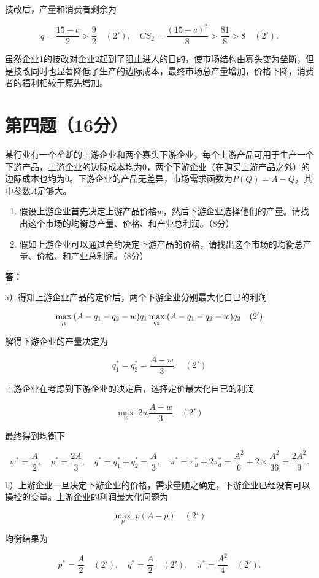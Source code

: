\documentclass[12pt]{article}
\begin{document}
技改后，产量和消费者剩余为

$$q=\frac{15-c}{2}>\frac{9}{2}\quad(2'),\quad CS_2=\frac{(15-c)^2}{8}>\frac{81}{8}>8\quad(2').$$

虽然企业1的技改对企业2起到了阻止进人的目的，使市场结构由寡头变为垒断，但是技改同时也显著降低了生产的边际成本，最终市场总产量增加，价格下降，消费者的福利相较于原先增加。

\section*{第四题（16分）}
某行业有一个垄断的上游企业和两个寡头下游企业，每个上游产品可用于生产一个下游产品，上游企业的边际成本均为0，两个下游企业（在购买上游产品之外）的边际成本也均为0。下游企业的产品无差异，市场需求函数为$P(Q)=A-Q$，其中参数$A$足够大。

\begin{enumerate}
\item 假设上游企业首先决定上游产品价格$w$，然后下游企业选择他们的产量。请找出这个市场的均衡总产量、价格、和产业总利润。（8分）
\item 假如上游企业可以通过合约决定下游产品的价格，请找出这个市场的均衡总产量、价格、和产业总利润。（8分）
\end{enumerate}

\noindent\textbf{答：}

a）得知上游企业产品的定价后，两个下游企业分别最大化自已的利润

$$\max_{q_{1}}\:(A-q_{1}-q_{2}-w)q_{1}\\\max_{q_{2}}\:(A-q_{1}-q_{2}-w)q_{2}\quad(2')$$

解得下游企业的产量决定为

$$q_1^*=q_2^*=\frac{A-w}{3}.\quad(2')$$

上游企业在考虑到下游企业的决定后，选择定价最大化自已的利润

$$\max_w\:2w\frac{A-w}{3}\quad(2')$$

最终得到均衡下

$$w^*=\frac{A}{2},\quad p^*=\frac{2A}{3},\quad q^*=q_1^*+q_2^*=\frac{A}{3},\quad\pi^*=\pi_u^*+2\pi_d^*=\frac{A^2}{6}+2\times\frac{A^2}{36}=\frac{2A^2}{9}.$$

b）上游企业一旦决定下游企业的价格，需求量随之确定，下游企业已经没有可以操控的变量。上游企业的利润最大化问题为

$$\max_{p}\:p(A-p)\quad(2')$$

均衡结果为

$$p^*=\frac{A}{2}\quad(2'),\quad q^*=\frac{A}{2}\quad(2'),\quad\pi^*=\frac{A^2}{4}\quad(2').$$
\end{document}
